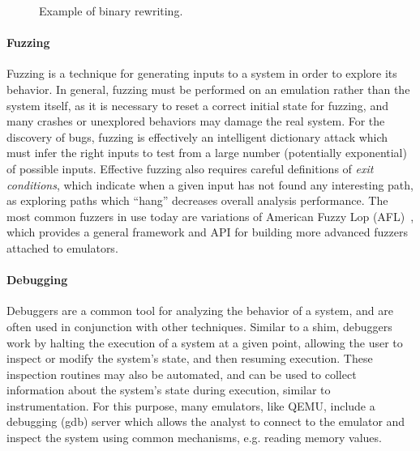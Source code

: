 \begin{figure}[h]
\centering
{}
\caption{Example of binary rewriting.}
\label{fig:livebinaryrewriting}
\end{figure}

\paragraph{Fuzzing} Fuzzing is a technique for generating inputs to a system in order to explore its behavior.
In general, fuzzing must be performed on an emulation rather than the system itself, as it is necessary to reset a correct initial state for fuzzing, and many crashes or unexplored behaviors may damage the real system.
For the discovery of bugs, fuzzing is effectively an intelligent dictionary attack which must infer the right inputs to test from a large number (potentially exponential) of possible inputs.
Effective fuzzing also requires careful definitions of \emph{exit conditions}, which indicate when a given input has not found any interesting path, as exploring paths which ``hang'' decreases overall analysis performance.
The most common fuzzers in use today are variations of American Fuzzy Lop (AFL)~\cite{zalewski2017technical}, which provides a general framework and API for building more advanced fuzzers attached to emulators.

\paragraph{Debugging} Debuggers are a common tool for analyzing the behavior of a system, and are often used in conjunction with other techniques.
Similar to a shim, debuggers work by halting the execution of a system at a given point, allowing the user to inspect or modify the system's state, and then resuming execution.
These inspection routines may also be automated, and can be used to collect information about the system's state during execution, similar to instrumentation.
For this purpose, many emulators, like QEMU, include a debugging (gdb) server which allows the analyst to connect to the emulator and inspect the system using common mechanisms, e.g. reading memory values.

